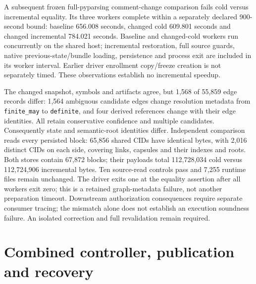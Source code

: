 A subsequent frozen full-pyparsing comment-change comparison fails cold versus
incremental equality. Its three workers complete within a separately declared
900-second bound: baseline 656.008 seconds, changed cold 609.801 seconds and
changed incremental 784.021 seconds. Baseline and changed-cold workers run
concurrently on the shared host; incremental restoration, full source guards,
native previous-state/bundle loading, persistence and process exit are included
in its worker interval. Earlier driver enrollment copy/freeze creation is not
separately timed. These observations establish no incremental speedup.

The changed snapshot, symbols and artifacts agree, but 1,568 of 55,859 edge
records differ: 1,564 ambiguous candidate edges change resolution metadata from
\texttt{finite\_may} to \texttt{definite}, and four derived references change
with their edge identities. All retain conservative confidence and multiple
candidates. Consequently state and semantic-root identities differ. Independent
comparison reads every persisted block: 65,856 shared CIDs have identical bytes,
with 2,016 distinct CIDs on each side, covering links, capsules and their indexes
and roots. Both stores contain 67,872 blocks; their payloads total 112,728,034
cold versus 112,724,906 incremental bytes. Ten source-read controls pass and
7,255 runtime files remain unchanged. The driver exits one at the equality
assertion after all workers exit zero; this is a retained graph-metadata failure,
not another preparation timeout. Downstream authorization consequences require
separate consumer tracing; the mismatch alone does not establish an execution
soundness failure. An isolated correction and full revalidation remain required.


\section{Combined controller, publication and recovery}
\label{sec:incremental-controller-publication}
